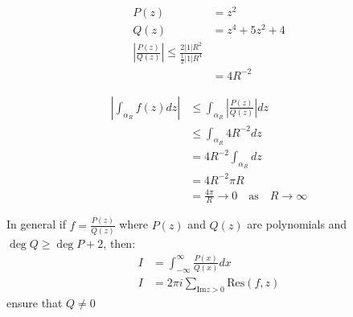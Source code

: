 \begin{example}
    \begin{align*}
        P(z) & = z^2                                                            \\
        Q(z) & = z^4 + 5z^2 + 4                                                 \\
        \left|\frac{P(z)}{Q(z)}\right| \leq \frac{2 |1| R^2}{\frac{1}{2}|1|R^4} \\
             & = 4R^{-2}
    \end{align*}

    \begin{align*}
        \left|\int_{\alpha_R} f(z)dz\right| & \leq \int_{\alpha_R} \left|\frac{P(z)}{Q(z)}\right| dz    \\
                                            & \leq \int_{\alpha_R} 4R^{-2} dz                           \\
                                            & = 4R^{-2} \int_{\alpha_R} dz                              \\
                                            & = 4R^{-2} \pi R                                           \\
                                            & = \frac{4\pi}{R} \to 0 \quad \text{as} \quad R \to \infty
    \end{align*}
\end{example}

\begin{proposition}
    In general if $f = \frac{P(z)}{Q(z)}$ where $P(z)$ and $Q(z)$ are polynomials and $\deg Q \geq \deg P + 2$, then:
    \begin{align*}
        I & = \int_{-\infty}^{\infty} \frac{P(x)}{Q(x)} dx   \\
        I & = 2\pi i \sum_{\text{Im} z > 0} \text{Res}(f, z)
    \end{align*}
    ensure that $Q \neq 0$
\end{proposition}